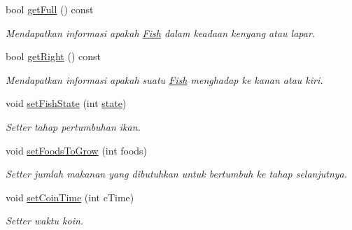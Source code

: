 \begin{DoxyCompactItemize}
\mbox{\label{classFish_afab92c9739af9d442b9e1623fb56a8d1}} 
bool \hyperlink{classFish_afab92c9739af9d442b9e1623fb56a8d1}{get\+Full} () const
\begin{DoxyCompactList}\small\item\em Mendapatkan informasi apakah \hyperlink{classFish}{Fish} dalam keadaan kenyang atau lapar. \end{DoxyCompactList}\item 
\mbox{\label{classFish_aa2dfabcc7a6845d0bec12e77d234a269}} 
bool \hyperlink{classFish_aa2dfabcc7a6845d0bec12e77d234a269}{get\+Right} () const
\begin{DoxyCompactList}\small\item\em Mendapatkan informasi apakah suatu \hyperlink{classFish}{Fish} menghadap ke kanan atau kiri. \end{DoxyCompactList}\item 
\mbox{\label{classFish_a53f7a677495bf56d80d9d5aa00505e98}} 
void \hyperlink{classFish_a53f7a677495bf56d80d9d5aa00505e98}{set\+Fish\+State} (int \hyperlink{classFish_ab77f075818cbdd5e350379418a35172d}{state})
\begin{DoxyCompactList}\small\item\em Setter tahap pertumbuhan ikan. \end{DoxyCompactList}\item 
\mbox{\label{classFish_ac3f82829278b62ecc56fc68240b9a3f2}} 
void \hyperlink{classFish_ac3f82829278b62ecc56fc68240b9a3f2}{set\+Foods\+To\+Grow} (int foods)
\begin{DoxyCompactList}\small\item\em Setter jumlah makanan yang dibutuhkan untuk bertumbuh ke tahap selanjutnya. \end{DoxyCompactList}\item 
\mbox{\label{classFish_a4283e7b3d67908fbf3c178a987159cb2}} 
void \hyperlink{classFish_a4283e7b3d67908fbf3c178a987159cb2}{set\+Coin\+Time} (int c\+Time)
\begin{DoxyCompactList}\small\item\em Setter waktu koin. \end{DoxyCompactList}\item 
\mbox{\label{classFish_ab61f43526d46c7edeee730be29c1eba0}} 

\end{DoxyCompactItemize}
